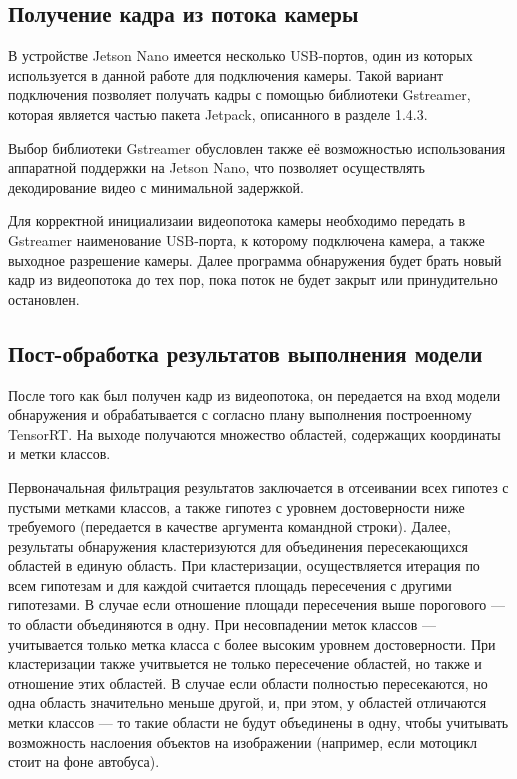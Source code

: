 \subsection{Получение кадра из потока камеры}

В устройстве Jetson Nano имеется несколько USB-портов, один из которых используется в данной работе для подключения камеры. Такой вариант подключения позволяет получать кадры с помощью библиотеки Gstreamer, которая является частью пакета Jetpack, описанного в разделе 1.4.3. 

Выбор библиотеки Gstreamer обусловлен также её возможностью использования аппаратной поддержки на Jetson Nano, что позволяет осуществлять декодирование видео с минимальной задержкой.

Для корректной инициализаии видеопотока камеры необходимо передать в Gstreamer наименование USB-порта, к которому подключена камера, а также выходное разрешение камеры. Далее программа обнаружения будет брать новый кадр из видеопотока до тех пор, пока поток не будет закрыт или принудительно остановлен.

\subsection{Пост-обработка результатов выполнения модели}

После того как был получен кадр из видеопотока, он передается на вход модели обнаружения и обрабатывается с согласно плану выполнения построенному TensorRT. На выходе получаются множество областей, содержащих координаты и метки классов. 

Первоначальная фильтрация результатов заключается в отсеивании всех гипотез с пустыми метками классов, а также гипотез с уровнем достоверности ниже требуемого (передается в качестве аргумента командной строки). Далее, результаты обнаружения кластеризуются для объединения пересекающихся областей в единую область. При кластеризации, осуществляется итерация по всем гипотезам и для каждой считается площадь пересечения с другими гипотезами. В случае если отношение площади пересечения выше порогового — то области объединяются в одну. При несовпадении меток классов — учитывается только метка класса с более высоким уровнем достоверности. При кластеризации также учитвыется не только пересечение областей, но также и отношение этих областей. В случае если области полностью пересекаются, но одна область значительно меньше другой, и, при этом, у областей отличаются метки классов — то такие области не будут объединены в одну, чтобы учитывать возможность наслоения объектов на изображении (например, если мотоцикл стоит на фоне автобуса).

